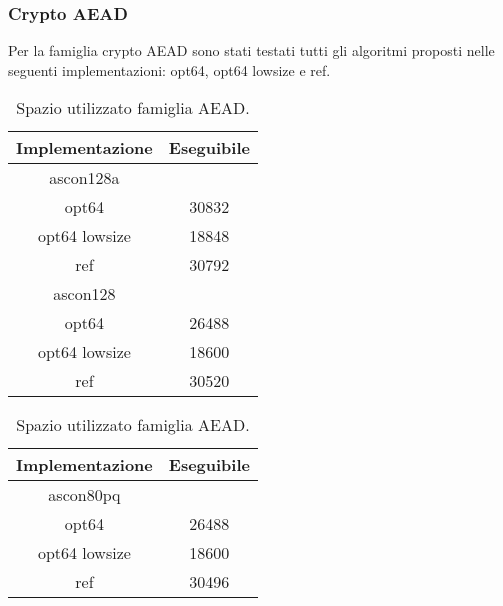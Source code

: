 \subsubsection{Crypto AEAD}

Per la famiglia crypto AEAD sono stati testati tutti gli algoritmi proposti nelle seguenti implementazioni: opt64, opt64 lowsize e ref.

\begin{table}[h]
    \caption{Spazio utilizzato famiglia AEAD.}
    \begin{minipage}[t]{0.5\linewidth}
        \centering
        \begin{tabular}{|c|c|}
            \hline
            Implementazione & Eseguibile \\
            \hline
            ascon128a & \\
            \hline
            opt64 & 30832 \\
            \hline
            opt64 lowsize & 18848 \\
            \hline
            ref & 30792 \\
            \hline
            ascon128 & \\
            \hline
            opt64 & 26488 \\
            \hline
            opt64 lowsize & 18600 \\
            \hline
            ref & 30520 \\
            \hline
        \end{tabular}
    \end{minipage}
    \begin{minipage}[t]{0.5\linewidth}
        \centering
        \begin{tabular}{|c|c|}
            \hline
            Implementazione & Eseguibile \\
            \hline
            ascon80pq & \\
            \hline
            opt64 & 26488 \\
            \hline
            opt64 lowsize & 18600 \\
            \hline
            ref & 30496 \\
            \hline
        \end{tabular}
    \end{minipage}
\end{table}

